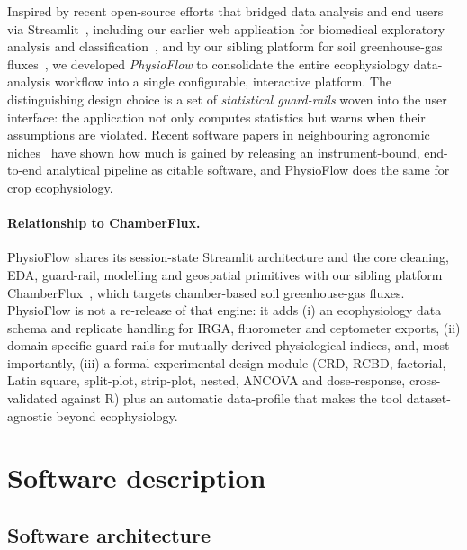 \documentclass[preprint,12pt,a4paper]{elsarticle}
\begin{document}
Inspired by recent open-source efforts that bridged data analysis and end users via Streamlit~\cite{Streamlit}, including our earlier web application for biomedical exploratory analysis and classification~\cite{daSilva2025Parkinson}, and by our sibling platform for soil greenhouse-gas fluxes~\cite{DaSilva2026Goias}, we developed \emph{PhysioFlow} to consolidate the entire ecophysiology data-analysis workflow into a single configurable, interactive platform. The distinguishing design choice is a set of \emph{statistical guard-rails} woven into the user interface: the application not only computes statistics but warns when their assumptions are violated. Recent software papers in neighbouring agronomic niches~\cite{Magnani2026apsimNGpy,Crecco2026prismatools} have shown how much is gained by releasing an instrument-bound, end-to-end analytical pipeline as citable software, and PhysioFlow does the same for crop ecophysiology.

\paragraph{Relationship to ChamberFlux.} PhysioFlow shares its session-state Streamlit architecture and the core cleaning, EDA, guard-rail, modelling and geospatial primitives with our sibling platform ChamberFlux~\cite{DaSilva2026Goias}, which targets chamber-based soil greenhouse-gas fluxes. PhysioFlow is not a re-release of that engine: it adds (i) an ecophysiology data schema and replicate handling for IRGA, fluorometer and ceptometer exports, (ii) domain-specific guard-rails for mutually derived physiological indices, and, most importantly, (iii) a formal experimental-design module (CRD, RCBD, factorial, Latin square, split-plot, strip-plot, nested, ANCOVA and dose-response, cross-validated against R) plus an automatic data-profile that makes the tool dataset-agnostic beyond ecophysiology.

\section{Software description}\label{sec:software}

\subsection{Software architecture}\label{sec:arch}
\end{document}
